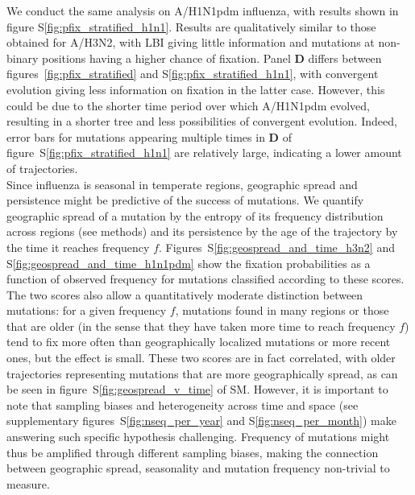 \documentclass[reprint,amsmath,amssymb,superscriptaddress,showpacs,rmp]{revtex4-1}
\newcommand{\sref}[1]{S\ref{#1}}
\begin{document}
We conduct the same analysis on A/H1N1pdm influenza, with results shown in figure \sref{fig:pfix_stratified_h1n1}. 
Results are qualitatively similar to those obtained for A/H3N2, with LBI giving little information and mutations at non-binary positions having a higher chance of fixation. 
Panel \textbf{D} differs between figures~\ref{fig:pfix_stratified} and \sref{fig:pfix_stratified_h1n1}, with convergent evolution giving less information on fixation in the latter case. 
However, this could be due to the shorter time period over which A/H1N1pdm evolved, resulting in a shorter tree and less possibilities of convergent evolution. 
Indeed, error bars for mutations appearing multiple times in \textbf{D} of figure~\sref{fig:pfix_stratified_h1n1} are relatively large, indicating a lower amount of trajectories.\\

Since influenza is seasonal in temperate regions, geographic spread and persistence might be predictive of the success of mutations. 
We quantify geographic spread of a mutation by the entropy of its frequency distribution across regions (see methods) and its persistence by the age of the trajectory by the time it reaches frequency $f$. 
Figures~\sref{fig:geospread_and_time_h3n2} and \sref{fig:geospread_and_time_h1n1pdm} show the fixation probabilities as a function of observed frequency for mutations classified according to these scores. 
The two scores also allow a quantitatively moderate distinction between mutations: for a given frequency $f$, mutations found in many regions or those that are older (in the sense that they have taken more time to reach frequency $f$) tend to fix more often than geographically localized mutations or more recent ones, but the effect is small.
These two scores are in fact correlated, with older trajectories representing mutations that are more geographically spread, as can be seen in figure~\sref{fig:geospread_v_time} of SM.
However, it is important to note that sampling biases and heterogeneity across time and space (see supplementary figures~\sref{fig:nseq_per_year} and \sref{fig:nseq_per_month}) make answering such specific hypothesis challenging.
Frequency of mutations might thus be amplified through different sampling biases, making the connection between geographic spread, seasonality and mutation frequency non-trivial to measure. 
\end{document}
